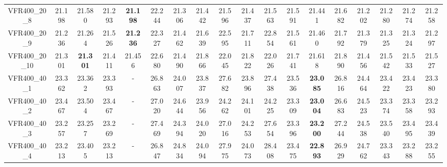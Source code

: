 \begin{tabular}{cc|ccc|ccccccccccccc}
VFR400\_20\_8      & 21.198           & 21.580           & 21.293           & {\bf 21.198}     & 22.244           & 21.306           & 21.442           & 21.596           & 21.437           & 21.563           & 21.591           & 21.441           & 21.682           & 21.202           & 21.280           & 21.274           & 21.258          \\ 
VFR400\_20\_9      & 21.236           & 21.264           & 21.526           & {\bf 21.236}     & 22.327           & 21.462           & 21.639           & 22.595           & 21.711           & 22.854           & 21.561           & 21.460           & 21.792           & 21.379           & 21.325           & 21.324           & 21.297          \\ 
VFR400\_20\_10     & 21.301           & {\bf 21.301}     & 21.411           & 21.456           & 22.680           & 21.490           & 21.866           & 22.045           & 21.822           & 22.026           & 21.741           & 21.618           & 21.890           & 21.456           & 21.542           & 21.533           & 21.527          \\ 
VFR400\_40\_1      & 23.362           & 23.362           & 23.393           & -                & 26.863           & 24.007           & 23.837           & 27.682           & 23.896           & 27.438           & 23.536           & {\bf 23.085}     & 26.816           & 24.464           & 23.422           & 23.423           & 23.380          \\ 
VFR400\_40\_2      & 23.467           & 23.504           & 23.467           & -                & 27.020           & 24.644           & 23.956           & 24.262           & 24.101           & 24.225           & 23.309           & {\bf 23.004}     & 26.683           & 24.523           & 23.374           & 23.358           & 23.293          \\ 
VFR400\_40\_3      & 23.257           & 23.257           & 23.269           & -                & 27.469           & 24.394           & 24.020           & 27.016           & 24.253           & 27.654           & 23.396           & {\bf 23.200}     & 27.244           & 24.538           & 23.540           & 23.495           & 23.439          \\ 
VFR400\_40\_4      & 23.213           & 23.405           & 23.213           & -                & 26.847           & 24.834           & 24.094           & 27.975           & 24.073           & 28.408           & 23.475           & {\bf 22.893}     & 26.929           & 24.762           & 23.343           & 23.288           & 23.255          \\ 

\end{tabular}
